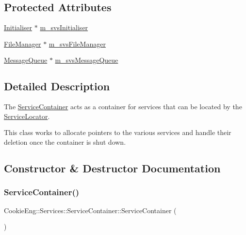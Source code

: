\subsection*{Protected Attributes}
\begin{DoxyCompactItemize}
\item 
\hyperlink{class_cookie_eng_1_1_services_1_1_initialiser}{Initialiser} $\ast$ \hyperlink{class_cookie_eng_1_1_services_1_1_service_container_ae775cf624dc67f6f22e33c2437a2356e}{m\+\_\+svs\+Initialiser}
\item 
\hyperlink{class_cookie_eng_1_1_services_1_1_file_manager}{File\+Manager} $\ast$ \hyperlink{class_cookie_eng_1_1_services_1_1_service_container_abf0baf79c971ef5edc4be3c950fb7cda}{m\+\_\+svs\+File\+Manager}
\item 
\hyperlink{class_cookie_eng_1_1_services_1_1_message_queue}{Message\+Queue} $\ast$ \hyperlink{class_cookie_eng_1_1_services_1_1_service_container_a5c4f37d595fdaeb210fba253a9dbc101}{m\+\_\+svs\+Message\+Queue}
\end{DoxyCompactItemize}


\subsection{Detailed Description}
The \hyperlink{class_cookie_eng_1_1_services_1_1_service_container}{Service\+Container} acts as a container for services that can be located by the \hyperlink{class_cookie_eng_1_1_services_1_1_service_locator}{Service\+Locator}. 

This class works to allocate pointers to the various services and handle their deletion once the container is shut down. 

\subsection{Constructor \& Destructor Documentation}
\mbox{\label{class_cookie_eng_1_1_services_1_1_service_container_a6d91b2942fd8e169641b5e723ec0e999}} 
\subsubsection{\texorpdfstring{Service\+Container()}{ServiceContainer()}}
{\footnotesize\ttfamily Cookie\+Eng\+::\+Services\+::\+Service\+Container\+::\+Service\+Container (\begin{DoxyParamCaption}{ }\end{DoxyParamCaption})}



